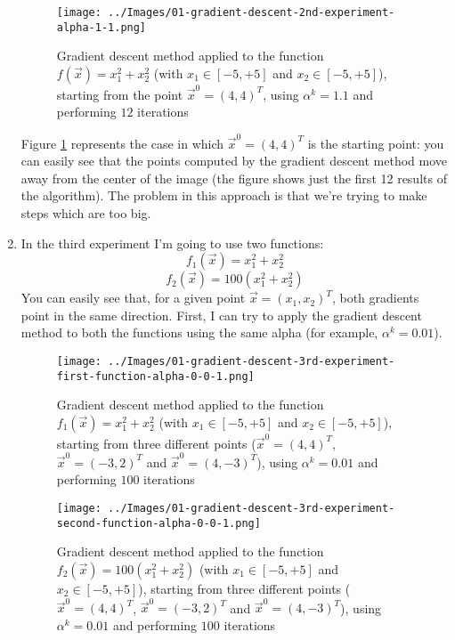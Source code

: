 \begin{enumerate}
            \begin{figure}
                \centering
                \texttt{[image: ../Images/01-gradient-descent-2nd-experiment-alpha-1-1.png]}
                \caption{Gradient descent method applied to the function \(f(\vec{x}) = x_{1}^{2} + x_{2}^{2}\) (with \(x_1 \in [-5, +5]\) and \(x_2 \in [-5, +5]\)), starting from the point \(\vec{x}^0 = (4,4)^T\), using \(\alpha^k = 1.1\) and performing \(12\) iterations}
                \label{gradient-descent-2nd-experiment-alpha-1-1}
            \end{figure}
            Figure \ref{gradient-descent-2nd-experiment-alpha-1-1} represents the case in which \(\vec{x}^0 = (4,4)^T\) is the starting point: you can easily see that the points computed by the gradient descent method move away from the center of the image (the figure shows just the first 12 results of the algorithm). The problem in this approach is that we're trying to make steps which are too big.
            \item In the third experiment I'm going to use two functions:
            \[f_1(\vec{x}) = x_{1}^{2} + x_{2}^{2}\]
            \[f_2(\vec{x}) = 100(x_{1}^{2} + x_{2}^{2})\]
            You can easily see that, for a given point \(\vec{x} = (x_1, x_2)^T\), both gradients point in the same direction. First, I can try to apply the gradient descent method to both the functions using the same alpha (for example, \(\alpha^k = 0.01\)).
            \begin{figure}
                \centering
                \texttt{[image: ../Images/01-gradient-descent-3rd-experiment-first-function-alpha-0-0-1.png]}
                \caption{Gradient descent method applied to the function \(f_1(\vec{x}) = x_{1}^{2} + x_{2}^{2}\) (with \(x_1 \in [-5, +5]\) and \(x_2 \in [-5, +5]\)), starting from three different points (\(\vec{x}^0 = (4,4)^T\), \(\vec{x}^0 = (-3,2)^T\) and \(\vec{x}^0 = (4,-3)^T\)), using \(\alpha^k = 0.01\) and performing \(100\) iterations}
                \label{gradient-descent-3rd-experiment-first-function-alpha-0-0-1}
            \end{figure}
            \begin{figure}
                \centering
                \texttt{[image: ../Images/01-gradient-descent-3rd-experiment-second-function-alpha-0-0-1.png]}
                \caption{Gradient descent method applied to the function \(f_2(\vec{x}) = 100(x_{1}^{2} + x_{2}^{2})\) (with \(x_1 \in [-5, +5]\) and \(x_2 \in [-5, +5]\)), starting from three different points (\(\vec{x}^0 = (4,4)^T\), \(\vec{x}^0 = (-3,2)^T\) and \(\vec{x}^0 = (4,-3)^T\)), using \(\alpha^k = 0.01\) and performing \(100\) iterations}

\end{figure}
\end{enumerate}
